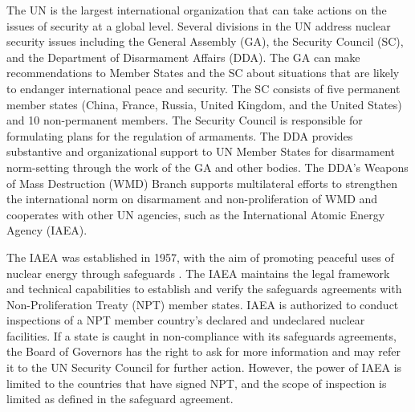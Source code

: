 \documentclass{report}
\begin{document}
The UN is the largest international organization that can take actions on the issues of security at a global level. Several divisions in the UN address nuclear security issues including the General Assembly (GA), the Security Council (SC), and the Department of Disarmament Affairs (DDA). The GA can make recommendations to Member States and the SC about situations that are likely to endanger international peace and security. The SC consists of five permanent member states (China, France, Russia, United Kingdom, and the United States) and 10 non-permanent members. The Security Council is responsible for formulating plans for the regulation of armaments. The DDA provides substantive and organizational support to UN Member States for disarmament norm-setting through the work of the GA and other bodies. The DDA's Weapons of Mass Destruction (WMD) Branch supports multilateral efforts to strengthen the international norm on disarmament and non-proliferation of WMD and cooperates with other UN agencies, such as the International Atomic Energy Agency (IAEA).

The IAEA was established in 1957, with the aim of promoting peaceful uses of nuclear energy through safeguards \cite{InternationalAtomicEnergyAgency}. The IAEA maintains the legal framework and technical capabilities to establish and verify the safeguards agreements with Non-Proliferation Treaty (NPT) member states. IAEA is authorized to conduct inspections of a NPT member country's declared and undeclared nuclear facilities. If a state is caught in non-compliance with its safeguards agreements, the Board of Governors has the right to ask for more information and may refer it to the UN Security Council for further action. However, the power of IAEA is limited to the countries that have signed NPT, and the scope of inspection is limited as defined in the safeguard agreement. 



\newpage
\pagestyle{fancyTOC}




\thispagestyle{fancyTOC}
\end{document}
